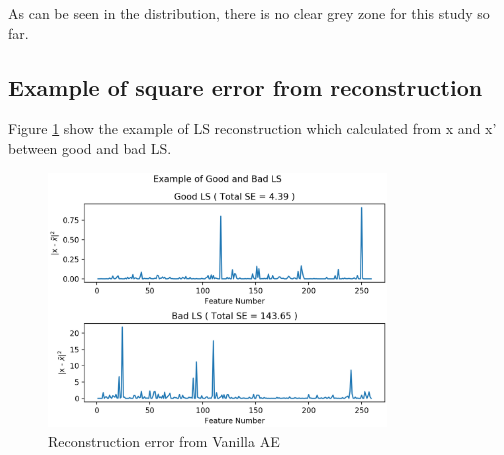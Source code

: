 As can be seen in the distribution, there is no clear grey zone for this study so far.

\subsection{Example of square error from reconstruction}
Figure \ref{fig:2016_example_se} show the example of LS reconstruction which calculated from x and x' between good and bad LS.
\begin{figure}[h!]
    \centering
    \includegraphics[width=0.8\textwidth]{images/reco/2016/example_se.png}
    \caption{Reconstruction error from Vanilla AE}
    \label{fig:2016_example_se}
\end{figure}

